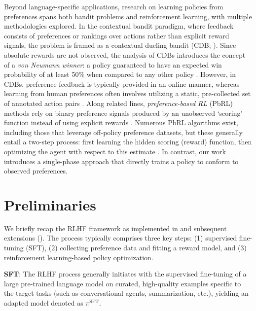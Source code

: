 Beyond language-specific applications, research on learning policies from preferences spans both bandit problems and reinforcement learning, with multiple methodologies explored. In the contextual bandit paradigm, where feedback consists of preferences or rankings over actions rather than explicit reward signals, the problem is framed as a contextual dueling bandit (CDB; \cite{yue2012karmed,dudik2015contextual}). Since absolute rewards are not observed, the analysis of CDBs introduces the concept of a \textit{von Neumann winner}: a policy guaranteed to have an expected win probability of at least 50\% when compared to any other policy \citep{dudik2015contextual}. However, in CDBs, preference feedback is typically provided in an online manner, whereas learning from human preferences often involves utilizing a static, pre-collected set of annotated action pairs \citep{yan2022human}. Along related lines, \textit{preference-based RL} (PbRL) methods rely on binary preference signals produced by an unobserved ‘scoring’ function instead of using explicit rewards \citep{BusaFekete2014,ruiz2023dueling}. Numerous PbRL algorithms exist, including those that leverage off-policy preference datasets, but these generally entail a two-step process: first learning the hidden scoring (reward) function, then optimizing the agent with respect to this estimate \citep{jain2013learning,BusaFekete2014,christiano2017deep,sadigh2017active,kupcsik2018learning}. In contrast, our work introduces a single-phase approach that directly trains a policy to conform to observed preferences.

\section{Preliminaries}\label{section:prelims}

We briefly recap the RLHF framework as implemented in \citeauthor{ziegler2020finetuning} and subsequent extensions (\citep{stiennon2022learning, bai2022training, ouyang2022training}). The process typically comprises three key steps: (1) supervised fine-tuning (SFT), (2) collecting preference data and fitting a reward model, and (3) reinforcement learning-based policy optimization.

\textbf{SFT}: The RLHF process generally initiates with the supervised fine-tuning of a large pre-trained language model on curated, high-quality examples specific to the target tasks (such as conversational agents, summarization, etc.), yielding an adapted model denoted as $\pi^\text{SFT}$.

